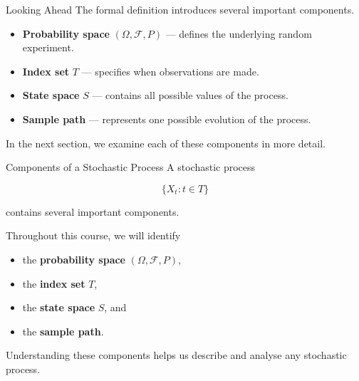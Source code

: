 \documentclass[
  ignorenonframetext,
  aspectratio=169,
]{beamer}
\providecommand{\tightlist}{%
  \setlength{\itemsep}{0pt}\setlength{\parskip}{0pt}}
\begin{document}
\begin{frame}{Looking Ahead}
\protect{}\label{looking-ahead-1}
The formal definition introduces several important components.

\begin{itemize}
\tightlist
\item
  \textbf{Probability space} \((\Omega,\mathcal{F},P)\) --- defines the
  underlying random experiment.
\item
  \textbf{Index set} \(T\) --- specifies when observations are made.
\item
  \textbf{State space} \(S\) --- contains all possible values of the
  process.
\item
  \textbf{Sample path} --- represents one possible evolution of the
  process.
\end{itemize}

In the next section, we examine each of these components in more detail.
\end{frame}

\begin{frame}{Components of a Stochastic Process}
\protect{}\label{components-of-a-stochastic-process}
A stochastic process

\[
\{X_t:t\in T\}
\]

contains several important components.

Throughout this course, we will identify

\begin{itemize}
\tightlist
\item
  the \textbf{probability space} \((\Omega,\mathcal{F},P)\),
\item
  the \textbf{index set} \(T\),
\item
  the \textbf{state space} \(S\), and
\item
  the \textbf{sample path}.
\end{itemize}

Understanding these components helps us describe and analyse any
stochastic process.
\end{frame}
\end{document}
